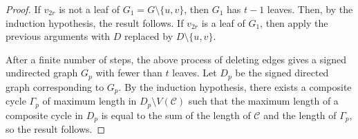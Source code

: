 \documentclass[10pt,a4paper]{amsart}
\numberwithin{equation}{section}
\def\dist{{\rm dist}}
\begin{document}
\begin{proof}
	If $v_{2r}$ is not a leaf of $G_1=G\setminus\{u,v\}$, then $G_1$ has $t-1$ leaves. Then, by the induction hypothesis, the result follows.
	If $v_{2r}$ is a leaf of $G_1$, then apply the previous arguments with $D$ replaced by $D\setminus\{u,v\}$.
	
	
	
	
	
	
	
	
	
	
	After a finite number of steps, the above process of deleting edges gives a signed undirected graph $G_p$ with fewer than $t$ leaves. Let $D_p$ be the signed directed graph corresponding to $G_p$. By the induction hypothesis, there exists a composite cycle $\Gamma_p$ of maximum length in $D_p\setminus V(\mathcal{C})$ such that the maximum length of a composite cycle in $D_p$ is equal to the sum of the length of $\mathcal{C}$ and the length of $\Gamma_p$, so the result follows. %
\end{proof}
\end{document}
